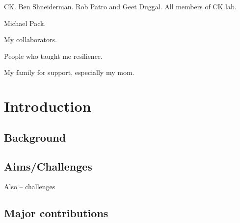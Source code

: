 \documentclass[12pt]{cmuthesis}
\begin{document}
\begin{acknowledgments}
CK. Ben Shneiderman. Rob Patro and Geet Duggal. All members of CK lab.

Michael Pack.

My collaborators.

People who taught me resilience.

My family for support, especially my mom.
\end{acknowledgments}



\tableofcontents
\listoffigures
\listoftables

\mainmatter


%
%
%
%
%


\chapter{Introduction}

\section{Background}

\section{Aims/Challenges}

Also -- challenges

\section{Major contributions}

\end{document}
